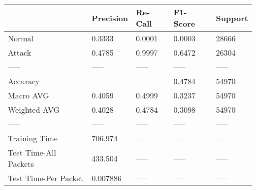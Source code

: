 \begin{tabular}{lllll}
\toprule
{} & Precision & Re-Call & F1-Score & Support \\
\midrule
Normal                &    0.3333 &  0.0001 &   0.0003 &   28666 \\
Attack                &    0.4785 &  0.9997 &   0.6472 &   26304 \\
-----                 &     ----- &   ----- &    ----- &   ----- \\
Accuracy              &           &         &   0.4784 &   54970 \\
Macro AVG             &    0.4059 &  0.4999 &   0.3237 &   54970 \\
Weighted AVG          &    0.4028 &  0.4784 &   0.3098 &   54970 \\
-----                 &     ----- &   ----- &    ----- &   ----- \\
Training Time         &   706.974 &   ----- &    ----- &   ----- \\
Test Time-All Packets &   433.504 &   ----- &    ----- &   ----- \\
Test Time-Per Packet  &  0.007886 &   ----- &    ----- &   ----- \\
\bottomrule
\end{tabular}
